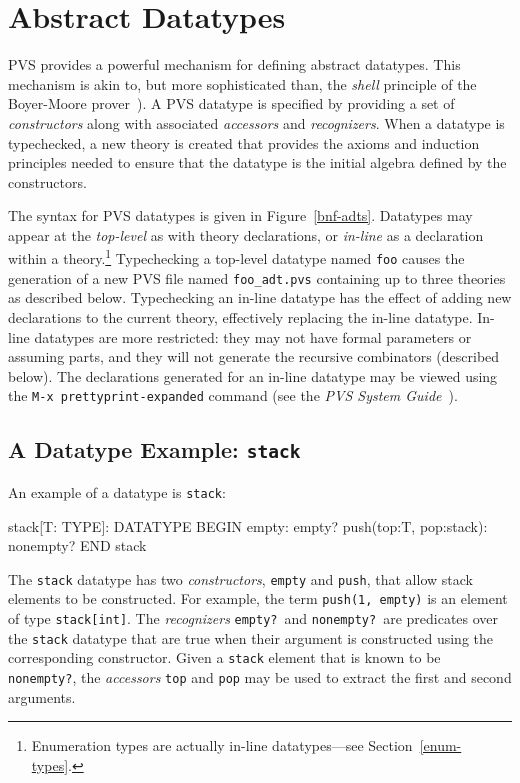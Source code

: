 
\chapter{Abstract Datatypes}\label{datatypes}\label{adts}

PVS provides a powerful mechanism for defining abstract datatypes.  This
mechanism is akin to, but more sophisticated than, the \emph{shell}
principle of the Boyer-Moore prover~\cite{Boyer-Moore79}).  A PVS datatype
is specified by providing a set of \emph{constructors} along with
associated \emph{accessors} and \emph{recognizers}.  When a datatype is
typechecked, a new theory is created that provides the axioms and
induction principles needed to ensure that the datatype is the initial
algebra defined by the constructors.


The syntax for PVS datatypes is given in Figure~\ref{bnf-adts}.  Datatypes
may appear at the \emph{top-level} as with theory declarations, or
\emph{in-line} as a declaration within a theory.\footnote{Enumeration
types are actually in-line datatypes---see Section~\ref{enum-types}.}
Typechecking a top-level datatype named \texttt{foo} causes the generation
of a new PVS file named \texttt{foo\_adt.pvs} containing up to three
theories as described below.  Typechecking an in-line datatype has the
effect of adding new declarations to the current theory, effectively
replacing the in-line datatype.  In-line datatypes are more restricted:
they may not have formal parameters or assuming parts, and they will not
generate the recursive combinators (described below).  The declarations
generated for an in-line datatype may be viewed using the 
\texttt{M-x~prettyprint-expanded} command (see the \emph{PVS System
Guide}~\cite{PVS:userguide}).

\section{A Datatype Example: \texttt{stack}}\label{stacks-adt}
An example of a datatype is \texttt{stack}:
\begin{pvsex}
  stack[T: TYPE]: DATATYPE
   BEGIN
    empty: empty?
    push(top:T, pop:stack): nonempty?
   END stack
\end{pvsex}
The \texttt{stack} datatype has two \emph{constructors}, \texttt{empty} and
\texttt{push}, that allow stack elements to be constructed.  For example,
the term \texttt{push(1, empty)} is an element of type \texttt{stack[int]}.
The \emph{recognizers} \texttt{empty?}\ and \texttt{nonempty?}\ are predicates
over the \texttt{stack} datatype that are true when their argument is
constructed using the corresponding constructor.  Given a \texttt{stack}
element that is known to be \texttt{nonempty?}, the \emph{accessors}
\texttt{top} and \texttt{pop} may be used to extract the first and second
arguments.


